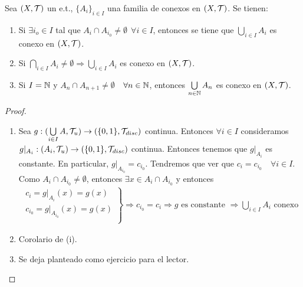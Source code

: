 \begin{prop}
    Sea $(X, \mathcal{T})$ un e.t., $\{A_i\}_{i\in I}$ una familia de conexos en $(X, \mathcal{T})$. Se tienen:
    \begin{enumerate}
        \item[(i)] Si $\exists i_o \in I$ tal que $A_i\cap A_{i_0}\neq \emptyset \ \ \forall i\in I$, entonces se tiene que $\bigcup\limits_{i\in I}A_i$ es conexo en $(X, \mathcal{T})$.
        \item[(ii)] Si $\bigcap\limits_{i\in I} A_i \neq \emptyset \Rightarrow \bigcup_{i\in I} A_i$ es conexo en $(X, \mathcal{T})$.
        \item[(iii)] Si $I=\mathbb{N}$ y $A_n\cap A_{n+1}\neq \emptyset$\ \ $\forall n\in \mathbb{N}$, entonces $\bigcup\limits_{n\in \mathbb{N}}A_n$ es conexo en $(X, \mathcal{T})$.  
    \end{enumerate}
    \begin{proof}\
        \begin{enumerate}
            \item[(i)] Sea $g:(\bigcup\limits_{i\in I}A, \mathcal{T}_u)\to (\{0,1\}, \mathcal{T}_{disc})$ continua. Entonces $\forall i \in I$ consideramos $g|_{A_i}:(A_i, \mathcal{T}_u)\to (\{0,1\}, \mathcal{T}_{disc})$ continua. Entonces tenemos que $g|_{A_i}$ es constante. En particular, $g|_{A_{i_0}}=c_{i_0}$. Tendremos que ver que $c_i=c_{i_0}$\ \ $\forall i \in I$. 
            Como $A_i\cap A_{i_0}\neq \emptyset$, entonces $\exists x \in A_i \cap A_{i_0}$ y entonces
            \begin{align*}
                \left. 
                \begin{array}{c}
                    c_i=g|_{A_i}(x) = g(x)\\
                    c_{i_0}=g|_{A_{i_0}}(x) = g(x)\\
                \end{array}
                \right\} \Rightarrow c_{i_0}=c_i \Rightarrow g \text{ es constante }\Rightarrow \bigcup\limits_{i\in I}A_i \text{ conexo}
            \end{align*}
            \item[(ii)] Corolario de (i).
            \item[(iii)] Se deja planteado como ejercicio para el lector.
        \end{enumerate}
    \end{proof}
\end{prop}

